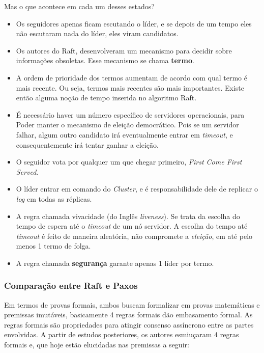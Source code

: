 Mas o que acontece em cada um desses estados?

\begin{itemize}
\item Os seguidores apenas ficam escutando o líder, e se depois de um tempo eles não escutaram nada do líder, eles viram candidatos.
\item Os autores do Raft, desenvolveram um mecanismo para decidir sobre informações obsoletas. Esse mecanismo se chama \textbf{termo}.
\item A ordem de prioridade dos termos aumentam de acordo com qual termo é mais recente. Ou seja, termos mais recentes são mais importantes. Existe então alguma noção de tempo inserida no algoritmo Raft.
\item É necessário haver um número específico de servidores operacionais, para Poder manter o mecanismo de eleição democrático. Pois se um servidor falhar, algum outro candidato irá eventualmente entrar em \textit{timeout}, e consequentemente irá tentar ganhar a eleição.
\item O seguidor vota por qualquer um que chegar primeiro, \textit{First Come First Served}.
\item O líder entrar em comando do \textit{Cluster}, e é responsabilidade dele de replicar o \textit{log} em todas as réplicas.
\item A regra chamada vivacidade (do Inglês \textit{liveness}). Se trata da escolha do tempo de espera até o \textit{timeout} de um nó servidor. A escolha do tempo até \textit{timeout} é feito de maneira aleatória, não compromete a \textit{eleição}, em até pelo menos 1 termo de folga.
\item A regra chamada \textbf{segurança} garante apenas 1 líder por termo.
\end{itemize}

\subsubsection{Comparação entre Raft e Paxos}

Em termos de provas formais, ambos buscam formalizar em provas matemáticas e premissas imutáveis, basicamente 4 regras formais dão embasamento formal. As regras formais são propriedades para atingir consenso assíncrono entre as partes envolvidas. A partir de estudos posteriores, os autores \textcite{MOSTEFAOUI_RAYNAL} esmiuçaram 4 regras formais e, que hoje estão elucidadas nas premissas a seguir:

